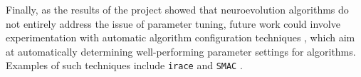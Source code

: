 Finally, as the results of the project showed that neuroevolution algorithms do not entirely address the issue of parameter tuning, future work could involve experimentation with
automatic algorithm configuration techniques \cite{automl}, which aim at automatically determining well-performing parameter settings for algorithms. Examples of such techniques include
\texttt{irace} \cite{irace} and \texttt{SMAC} \cite{smac}.
